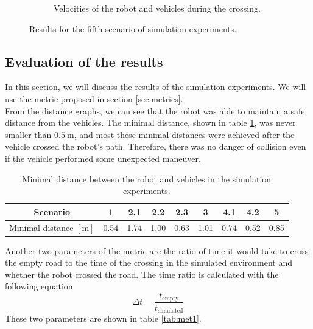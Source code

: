\begin{figure}[H]
\begin{subfigure}{0.49\linewidth}
                    \caption{Velocities of the robot and vehicles during the crossing.}
                    \label{fig:scene5_vel}
                \end{subfigure}
                \caption{Results for the fifth scenario of simulation experiments.}
                \label{fig:scene5_graphs}
            \end{figure}
    \subsection{Evaluation of the results}
        In this section, we will discuss the results of the simulation experiments. We will use the metric proposed in section \ref{sec:metrics}.\\
        From the distance graphs, we can see that the robot was able to maintain a safe distance from the vehicles. The minimal distance, shown in table \ref{tab:dist}, was never smaller than $0.5\:\si{\m}$, and most these minimal distances were achieved after the vehicle crossed the robot's path. Therefore, there was no danger of collision even if the vehicle performed some unexpected maneuver.\\
        \begin{table}[H]
            \centering
            \begin{tabular}{|c||c|c|c|c|c|c|c|c|}
                \hline
                Scenario & 1 & 2.1 & 2.2 & 2.3 & 3 & 4.1 & 4.2 & 5 \\
                \hline
                Minimal distance $[\si{\m}]$ & 0.54 & 1.74 & 1.00 & 0.63 & 1.01 & 0.74 & 0.52 & 0.85 \\
                \hline
            \end{tabular}
            \caption{Minimal distance between the robot and vehicles in the simulation experiments.}
            \label{tab:dist}
        \end{table}
        Another two parameters of the metric are the ratio of time it would take to cross the empty road to the time of the crossing in the simulated environment and whether the robot crossed the road. The time ratio is calculated with the following equation
        \begin{equation}
            \Delta t = \frac{t_{\text{empty}}}{t_{\text{simulated}}}
        \end{equation}
        \noindent These two parameters are shown in table \ref{tab:met1}.
